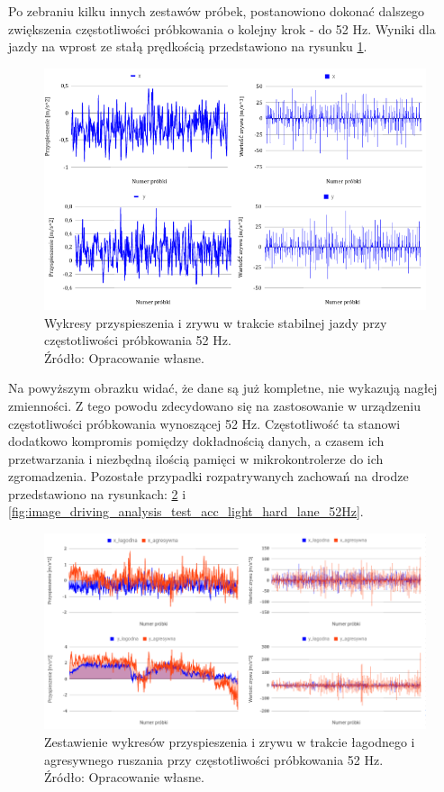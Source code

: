 Po zebraniu kilku innych zestawów próbek, postanowiono dokonać dalszego zwiększenia częstotliwości próbkowania o kolejny krok - do 52 Hz. Wyniki dla jazdy na wprost ze stałą prędkością przedstawiono na rysunku \ref{fig:image_driving_analysis_test_52Hz}.

\begin{figure}[H]
	\centering
	\includegraphics[width=15cm]{img/driving_analysis/stabilna_52.png}
	\caption{Wykresy przyspieszenia i zrywu w trakcie stabilnej jazdy przy częstotliwości próbkowania 52 Hz.
	\\Źródło: Opracowanie własne.}
	\label{fig:image_driving_analysis_test_52Hz}
\end{figure}

Na powyższym obrazku widać, że dane są już kompletne, nie wykazują nagłej zmienności. Z tego powodu zdecydowano się na zastosowanie w urządzeniu częstotliwości próbkowania wynoszącej 52 Hz. Częstotliwość ta stanowi dodatkowo kompromis pomiędzy dokładnością danych, a czasem ich przetwarzania i niezbędną ilością pamięci w mikrokontrolerze do ich zgromadzenia. Pozostałe przypadki rozpatrywanych zachowań na drodze przedstawiono na rysunkach: \ref{fig:image_driving_analysis_test_acc_light_aggressive_52Hz} i \ref{fig:image_driving_analysis_test_acc_light_hard_lane_52Hz}.

\begin{figure}[H]
	\centering
	\includegraphics[width=16cm]{img/driving_analysis/zestawienie_lagodna_ostra-ruszanie.png}
	\caption{Zestawienie wykresów przyspieszenia i zrywu w trakcie łagodnego i agresywnego ruszania przy częstotliwości próbkowania 52 Hz.
	\\Źródło: Opracowanie własne.}
	\label{fig:image_driving_analysis_test_acc_light_aggressive_52Hz}
\end{figure}

